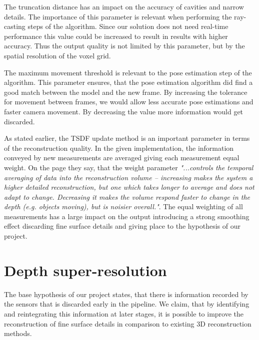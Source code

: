 \documentclass{ucl_thesis}
\begin{document}
\par The truncation distance has an impact on the accuracy of cavities and narrow details. The importance of this parameter is relevant when performing the ray-casting steps of the algorithm. Since our solution does not need real-time performance this value could be increased to result in results with higher accuracy. Thus the output quality is not limited by this parameter, but by the spatial resolution of the voxel grid.

\par The maximum movement threshold is relevant to the pose estimation step of the algorithm. This parameter ensures, that the pose estimation algorithm did find a good match between the model and the new frame. By increasing the tolerance for movement between frames, we would allow less accurate pose estimations and faster camera movement. By decreasing the value more information would get discarded.

\par As stated earlier, the TSDF update method is an important parameter in terms of the reconstruction quality. In the given implementation, the information conveyed by new measurements are averaged giving each measurement equal weight. On the \citep{KinectFuSDKExample} page they say, that the weight parameter {\it "...controls the temporal averaging of data into the reconstruction volume – increasing makes the system a higher detailed reconstruction, but one which takes longer to average and does not adapt to change. Decreasing it makes the volume respond faster to change in the depth (e.g. objects moving), but is noisier overall."}. The equal weighting of all measurements has a large impact on the output introducing a strong smoothing effect discarding fine surface details and giving place to the hypothesis of our project.

\section{Depth super-resolution}

\par The base hypothesis of our project states, that there is information recorded by the sensors that is discarded early in the pipeline. We claim, that by identifying and reintegrating this information at later stages, it is possible to improve the reconstruction of fine surface details in comparison to existing 3D reconstruction methods. 
\end{document}
